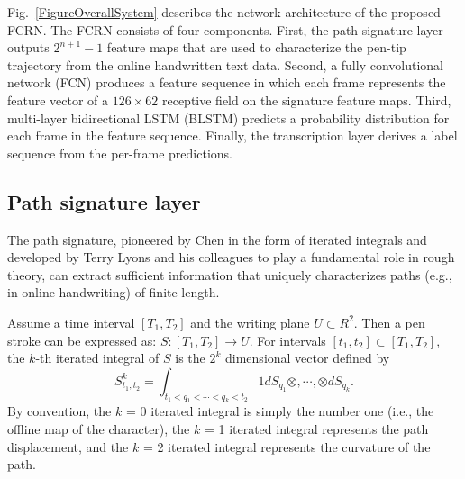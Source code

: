 \documentclass[10pt,conference,a4paper]{IEEEtran}
\begin{document}
Fig.~\ref{FigureOverallSystem} describes the network architecture of the proposed FCRN.
The FCRN consists of four components.
First, the path signature layer outputs $2^{n+1}-1$ feature maps that are used to characterize the pen-tip trajectory from the online handwritten text data.
Second, a fully convolutional network (FCN) produces a feature sequence in which each frame represents the feature vector of a $126 \times 62$ receptive field on the signature feature maps.
Third, multi-layer bidirectional LSTM (BLSTM) predicts a probability distribution for each frame in the feature sequence.
Finally, the transcription layer derives a label sequence from the per-frame predictions.



\subsection{Path signature layer}
The path signature, pioneered by Chen\cite{chen1958integration} in the form of iterated integrals and developed by Terry Lyons and his colleagues to play a fundamental role in rough theory\cite{hambly2010uniqueness,lyonssystem,lyons2014rough}, can extract sufficient information that uniquely characterizes paths (e.g., in online handwriting) of finite length.


Assume a time interval $[T_1,T_2]$ and the writing plane $U \subset R^2$. Then a pen stroke can be expressed as: $S:[T_1,T_2]\rightarrow U$. For intervals $[t_1,t_2]\subset [T_1,T_2]$, the $k$-th iterated integral of $S$ is the $2^k$ dimensional vector defined by
\begin{equation}
    S_{t_1,t_2}^k = \int_{t_1<q_1<\cdots <q_k<t_2} 1dS_{q_1} \otimes,\cdots,\otimes dS_{q_k}.
\end{equation}
By convention, the $k$ = 0 iterated integral is simply the number one (i.e., the offline map of the character), the $k$ = 1 iterated integral represents the path displacement, and the $k$ = 2 iterated integral represents the curvature of the path.
\end{document}
